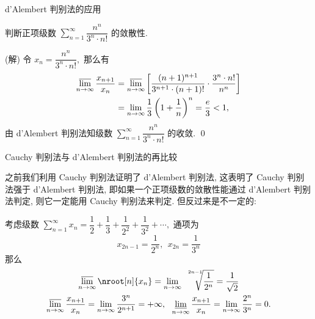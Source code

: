 
\begin{frame}{d'Alembert 判别法的应用}

\begin{eg}
\begin{center}
判断正项级数 $\sum\limits_{n=1}^\infty \dfrac{n^n}{3^n\cdot n!}$ 的敛散性.
\end{center}
\end{eg}

\pause
\vspace{1em}

\startproof[bg=yellow, fg=red](解)
令 $x_n = \dfrac{n^n}{3^n\cdot n!},$ 那么有
\begin{align*}
\varlimsup\limits_{n\to\infty} \dfrac{x_{n+1}}{x_n} & = \varlimsup\limits_{n\to\infty} \left[ \dfrac{(n+1)^{n+1}}{3^{n+1}\cdot (n+1)!} \cdot \dfrac{3^n\cdot n!}{n^n} \right] \\
& = \lim\limits_{n\to\infty} \dfrac{1}{3} \left( 1 + \dfrac{1}{n} \right)^n = \dfrac{e}{3} < 1,
\end{align*}
由 d'Alembert 判别法知级数 $\sum\limits_{n=1}^\infty \dfrac{n^n}{3^n\cdot n!}$ 的收敛.
\qed

\end{frame}


\begin{frame}{Cauchy 判别法与 d'Alembert 判别法的再比较}

之前我们利用 Cauchy 判别法证明了 d'Alembert 判别法, 这表明了 Cauchy 判别法强于 d'Alembert 判别法, 即如果一个正项级数的敛散性能通过 d'Alembert 判别法判定, 则它一定能用 Cauchy 判别法来判定. 但反过来是不一定的:

\pause
\vspace{0.5em}

\begin{eg}
考虑级数 $\sum\limits_{n=1}^\infty x_n = \dfrac{1}{2} + \dfrac{1}{3} + \dfrac{1}{2^2} + \dfrac{1}{3^2} + \cdots,$ 通项为
\vspace{-1em}
\[x_{2n-1} = \dfrac{1}{2^n}, ~~ x_{2n} = \dfrac{1}{3^n}\]
那么
\begin{gather*}
\varlimsup\limits_{n\to\infty} \nroot[n]{x_n} = \lim\limits_{n\to\infty} \sqrt[\leftroot{-6}\uproot{13}2n-1]{\frac{1}{2^n}} = \dfrac{1}{\sqrt{2}} \\
\varlimsup\limits_{n\to\infty} \dfrac{x_{n+1}}{x_n} = \lim\limits_{n\to\infty} \dfrac{3^n}{2^{n+1}} = +\infty, ~~ \varliminf\limits_{n\to\infty} \dfrac{x_{n+1}}{x_n} = \lim\limits_{n\to\infty} \dfrac{2^n}{3^n} = 0.
\end{gather*}
\end{eg}

\end{frame}

